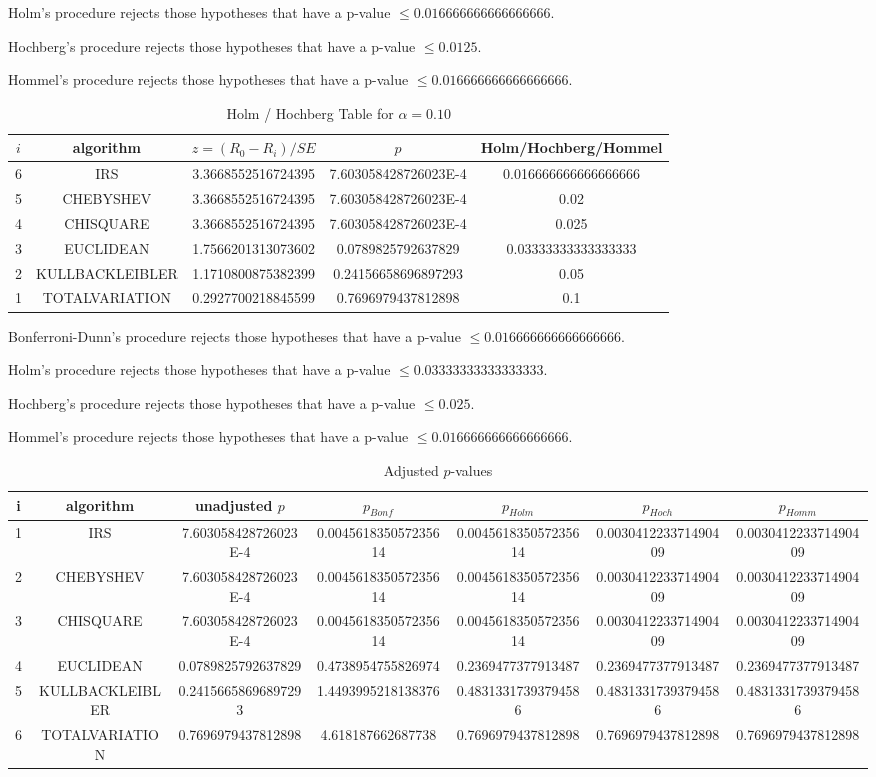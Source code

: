 \documentclass[a4paper,10pt]{article}
\begin{document}
\begin{landscape}
Holm's procedure rejects those hypotheses that have a p-value $\le0.016666666666666666$.


Hochberg's procedure rejects those hypotheses that have a p-value $\le0.0125$.


Hommel's procedure rejects those hypotheses that have a p-value $\le0.016666666666666666$.


\begin{table}[!htp]
\centering\tiny
\caption{Holm / Hochberg Table for $\alpha=0.10$}
\begin{tabular}{ccccc}
$i$&algorithm&$z=(R_0 - R_i)/SE$&$p$&Holm/Hochberg/Hommel\\
\hline
6&IRS&3.3668552516724395&7.603058428726023E-4&0.016666666666666666\\
5&CHEBYSHEV&3.3668552516724395&7.603058428726023E-4&0.02\\
4&CHISQUARE&3.3668552516724395&7.603058428726023E-4&0.025\\
3&EUCLIDEAN&1.7566201313073602&0.0789825792637829&0.03333333333333333\\
2&KULLBACKLEIBLER&1.1710800875382399&0.24156658696897293&0.05\\
1&TOTALVARIATION&0.2927700218845599&0.7696979437812898&0.1\\
\hline
\end{tabular}
\end{table}
Bonferroni-Dunn's procedure rejects those hypotheses that have a p-value $\le0.016666666666666666$.


Holm's procedure rejects those hypotheses that have a p-value $\le0.03333333333333333$.


Hochberg's procedure rejects those hypotheses that have a p-value $\le0.025$.


Hommel's procedure rejects those hypotheses that have a p-value $\le0.016666666666666666$.


\begin{table}[!htp]
\centering\tiny
\caption{Adjusted $p$-values}
\begin{tabular}{ccccccc}
i&algorithm&unadjusted $p$&$p_{Bonf}$&$p_{Holm}$&$p_{Hoch}$&$p_{Homm}$\\
\hline
1&IRS&7.603058428726023E-4&0.004561835057235614&0.004561835057235614&0.003041223371490409&0.003041223371490409\\
2&CHEBYSHEV&7.603058428726023E-4&0.004561835057235614&0.004561835057235614&0.003041223371490409&0.003041223371490409\\
3&CHISQUARE&7.603058428726023E-4&0.004561835057235614&0.004561835057235614&0.003041223371490409&0.003041223371490409\\
4&EUCLIDEAN&0.0789825792637829&0.4738954755826974&0.2369477377913487&0.2369477377913487&0.2369477377913487\\
5&KULLBACKLEIBLER&0.24156658696897293&1.4493995218138376&0.48313317393794586&0.48313317393794586&0.48313317393794586\\
6&TOTALVARIATION&0.7696979437812898&4.618187662687738&0.7696979437812898&0.7696979437812898&0.7696979437812898\\
\hline
\end{tabular}
\end{table}


\end{landscape}
\end{document}
